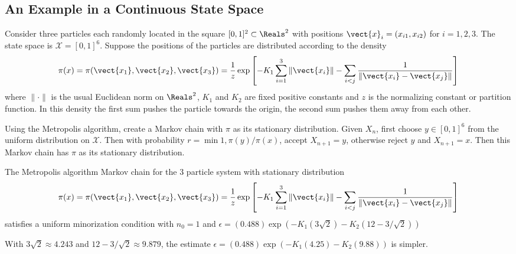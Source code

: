 \documentclass[12pt]{article}
\begin{document}

\subsection*{An Example in a Continuous State Space}
\begin{example}
    Consider three particles each randomly located in the square \( [0,1]^2
    \subset \Reals^2 \) with positions \( \vect{x}_i = (x_{i1}, x_{i2}) \)
    for \( i = 1,2,3 \).  The state space is \( \mathcal{X} = [0,1]^6 \).
    Suppose the positions of the particles are distributed according to
    the density
    \[
        \pi(x) = \pi(\vect{x_1}, \vect{x_2}, \vect{x_3}) = \frac{1}{z}
        \exp\left[ -K_1 \sum\limits_{i=1}^3 \|\vect{x_i}\| - \sum\limits_
        {i<j} \frac{1}{\| \vect{x_i} - \vect{x_j} \|} \right]
    \] where \( \| \cdot \| \) is the usual Euclidean norm on \( \Reals^2
    \), \( K_1 \) and \( K_2 \) are fixed positive constants and \( z \)
    is the normalizing constant or partition function.  In this density
    the first sum pushes the particle towards the origin, the second sum
    pushes them away from each other.

    Using the Metropolis algorithm, create a Markov chain with \( \pi \)
    as its stationary distribution.  Given \( X_n \), first choose \( y
    \in [0,1]^6 \) from the uniform distribution on \( \mathcal{X} \).
    Then with probability \( r = \min{1, \pi(y)/\pi(x)} \), accept \( X_
    {n+1} = y \), otherwise reject \( y \) and \( X_{n+1} = x \).  Then
    this Markov chain has \( \pi \) as its stationary distribution.

    \begin{lemma}
        The Metropolis algorithm Markov chain for the \( 3 \) particle
        system with stationary distribution
        \[
            \pi(x) = \pi(\vect{x_1}, \vect{x_2}, \vect{x_3}) = \frac{1}{z}
            \exp\left[ -K_1 \sum\limits_ {i=1}^3 \|\vect{x_i}\| - \sum\limits_
            {i<j} \frac{1}{\| \vect{x_i} - \vect{x_j} \|} \right]
        \] satisfies a uniform minorization condition with \( n_0 = 1 \)
        and \( \epsilon = (0.488) \exp(-K_1(3 \sqrt{2}) - K_2(12 - 3/
        \sqrt{2})) \)
    \end{lemma}

    \begin{remark}

    \end{remark}
    With \( 3 \sqrt{2} \approx 4.243 \) and \( 12 - 3/\sqrt{2} \approx
    9.879 \), the estimate \( \epsilon = (0.488) \exp(-K_1(4.25) - K_2(9.88))
    \) is simpler.


\end{example}
\end{document}
